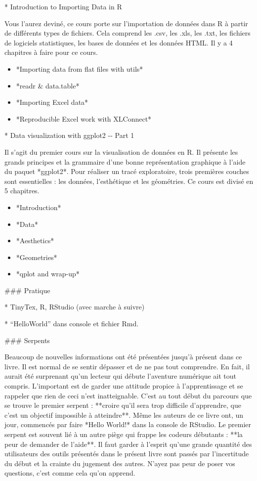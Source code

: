 \documentclass[
  letterpaper,
]{scrbook}
\begin{document}
* Introduction to Importing Data in R

Vous l'aurez deviné, ce cours porte sur l'importation de données dans R
à partir de différents types de fichiers. Cela comprend les .csv, les
.xls, les .txt, les fichiers de logiciels statistiques, les bases de
données et les données HTML. Il y a 4 chapitres à faire pour ce cours.

\begin{itemize}
\item
  *Importing data from flat files with utils*
\item
  *readr \& data.table*
\item
  *Importing Excel data*
\item
  *Reproducible Excel work with XLConnect*
\end{itemize}

* Data visualization with ggplot2 -\/- Part 1

Il s'agit du premier cours sur la visualisation de données en R. Il
présente les grands principes et la grammaire d'une bonne représentation
graphique à l'aide du paquet *ggplot2*. Pour réaliser un tracé
exploratoire, trois premières couches sont essentielles : les données,
l'esthétique et les géométries. Ce cours est divisé en 5 chapitres.

\begin{itemize}
\item
  *Introduction*
\item
  *Data*
\item
  *Aesthetics*
\item
  *Geometries*
\item
  *qplot and wrap-up*
\end{itemize}

\#\#\# Pratique

* TinyTex, R, RStudio (avec marche à suivre)

* ``HelloWorld'' dans console et fichier Rmd.

\#\#\# Serpents

Beaucoup de nouvelles informations ont été présentées jusqu'à présent
dans ce livre. Il est normal de se sentir dépasser et de ne pas tout
comprendre. En fait, il aurait été surprenant qu'un lecteur qui débute
l'aventure numérique ait tout compris. L'important est de garder une
attitude propice à l'apprentissage et se rappeler que rien de ceci n'est
inatteignable. C'est au tout début du parcours que se trouve le premier
serpent : **croire qu'il sera trop difficile d'apprendre, que c'est un
objectif impossible à atteindre**. Même les auteurs de ce livre ont, un
jour, commencés par faire *Hello World!* dans la console de RStudio. Le
premier serpent est souvent lié à un autre piège qui frappe les codeurs
débutants : **la peur de demander de l'aide**. Il faut garder à l'esprit
qu'une grande quantité des utilisateurs des outils présentés dans le
présent livre sont passés par l'incertitude du début et la crainte du
jugement des autres. N'ayez pas peur de poser vos questions, c'est comme
cela qu'on apprend.
\end{document}
